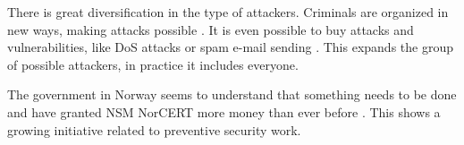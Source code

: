 There is great diversification in the type of attackers. Criminals are organized in new ways, making attacks possible \cite{KriposTrender}. It is even possible to buy attacks and vulnerabilities, like \ac{DoS} attacks or spam e-mail sending \cite{NorCERT2Kvartal2012}. This expands the group of possible attackers, in practice it includes everyone. 

The government in Norway seems to understand that something needs to be done and have granted \acs{NSM} \acs{NorCERT} more money than ever before \cite{NorCERT3Kvartal2012}. This shows a growing initiative related to preventive security work.

